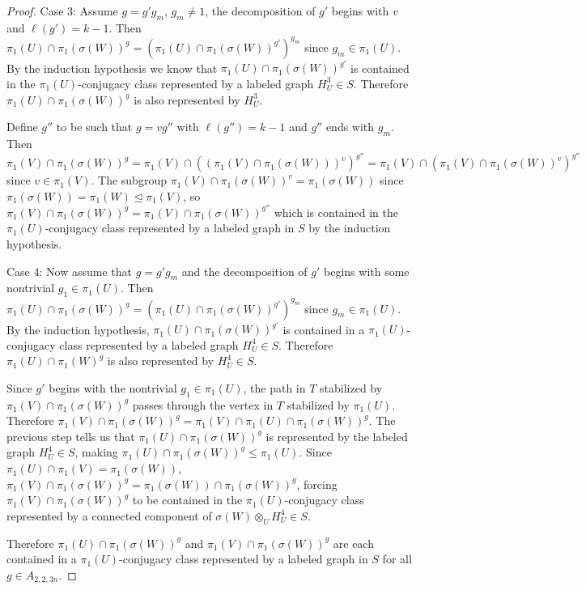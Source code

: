\documentclass[10pt,a4paper]{amsart}
\begin{document}
\begin{proof}
Case 3: Assume $g=g'g_m$, $g_m\neq1$, the decomposition of $g'$ begins with $v$ and $\ell(g')=k-1$. Then $\pi_1(U)\cap\pi_1(\sigma(W))^g=(\pi_1(U)\cap\pi_1(\sigma(W))^{g'})^{g_m}$ since $g_m\in\pi_1(U)$. By the induction hypothesis we know that $\pi_1(U)\cap\pi_1(\sigma(W))^{g'}$ is contained in the $\pi_1(U)$-conjugacy class represented by a labeled graph $H^3_U\in S$. Therefore $\pi_1(U)\cap\pi_1(\sigma(W))^g$ is also represented by $H^3_U$.


Define $g''$ to be such that $g=vg''$ with $\ell(g'')=k-1$ and $g''$ ends with $g_m$. Then $\pi_1(V)\cap\pi_1(\sigma(W))^g=\pi_1(V)\cap((\pi_1(V)\cap\pi_1(\sigma(W)))^v)^{g''}=\pi_1(V)\cap(\pi_1(V)\cap\pi_1(\sigma(W))^v)^{g''}$ since $v\in\pi_1(V)$. The subgroup $\pi_1(V)\cap\pi_1(\sigma(W))^v=\pi_1(\sigma(W))$ since $\pi_1(\sigma(W))=\pi_1(W)\unlhd\pi_1(V)$, so $\pi_1(V)\cap\pi_1(\sigma(W))^g=\pi_1(V)\cap\pi_1(\sigma(W))^{g''}$ which is contained in the $\pi_1(U)$-conjugacy class represented by a labeled graph in $S$ by the induction hypothesis.

Case 4: Now assume that $g=g'g_m$ and the decomposition of $g'$ begins with some nontrivial $g_1\in\pi_1(U)$. Then $\pi_1(U)\cap\pi_1(\sigma(W))^g=(\pi_1(U)\cap\pi_1(\sigma(W))^{g'})^{g_m}$ since $g_m\in\pi_1(U)$. By the induction hypothesis, $\pi_1(U)\cap\pi_1(\sigma(W))^{g'}$ is contained in a $\pi_1(U)$-conjugacy class represented by a labeled graph $H^4_U\in S$. Therefore $\pi_1(U)\cap\pi_1(W)^g$ is also represented by $H^4_U\in S$.


Since $g'$ begins with the nontrivial $g_1\in\pi_1(U)$, the path in $T$ stabilized by $\pi_1(V)\cap\pi_1(\sigma(W))^g$ passes through the vertex in $T$ stabilized by $\pi_1(U)$. Therefore $\pi_1(V)\cap\pi_1(\sigma(W))^g=\pi_1(V)\cap\pi_1(U)\cap\pi_1(\sigma(W))^g$. The previous step tells us that $\pi_1(U)\cap\pi_1(\sigma(W))^g$ is represented by the labeled graph $H^4_U\in S$, making $\pi_1(U)\cap\pi_1(\sigma(W))^g\leq\pi_1(U)$. Since $\pi_1(U)\cap\pi_1(V)=\pi_1(\sigma(W))$, $\pi_1(V)\cap\pi_1(\sigma(W))^g=\pi_1(\sigma(W))\cap\pi_1(\sigma(W))^g$, forcing $\pi_1(V)\cap\pi_1(\sigma(W))^g$ to be contained in the $\pi_1(U)$-conjugacy class represented by a connected component of $\sigma(W)\otimes_UH_U^4\in S$.

Therefore $\pi_1(U)\cap\pi_1(\sigma(W))^g$ and $\pi_1(V)\cap\pi_1(\sigma(W))^g$ are each contained in a $\pi_1(U)$-conjugacy class represented by a labeled graph in $S$ for all $g\in A_{2,2,3n}$.
\end{proof}
\end{document}
